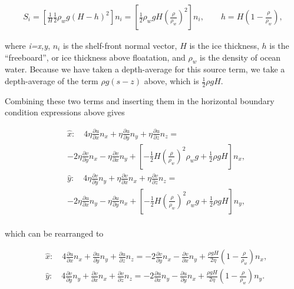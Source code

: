 \begin{align*}
S_{i}=\left[ \frac{1}{H}\frac{1}{2}\rho _{w}g\left( H-h \right)^{2} \right]n_{i}=\left[ \frac{1}{2}\rho _{w}gH\left( \frac{\rho }{\rho _{w}} \right)^{2} \right]n_{i},\quad \quad h=H\left( 1-\frac{\rho _{{}}}{\rho _{w}} \right),
\end{align*}

where  \textit{i=x,y}, $n_i$ is the shelf-front normal vector, $H$ is the ice thickness, $h$ is the ``freeboard'', or ice thickness above floatation, and $\rho_w$ is the density of ocean water. Because we have taken a depth-average for this source term, we take a depth-average of the term $\rho g\left( s-z \right)$ above, which is $\frac{1}{2}\rho gH$.

Combining these two terms and inserting them in the horizontal boundary condition expressions above gives

\begin{align*}
& \hat{x}:\quad 4\eta \frac{\partial u}{\partial x}n_{x}+\eta \frac{\partial u}{\partial y}n_{y}+\eta \frac{\partial u}{\partial z}n_{z}= \\
& -2\eta \frac{\partial v}{\partial y}n_{x}-\eta \frac{\partial v}{\partial x}n_{y}+\left[ -\frac{1}{2}H\left( \frac{\rho }{\rho _{w}} \right)^{2}\rho _{w}g+\frac{1}{2}\rho gH \right]n_{x}, \\ 
 & \hat{y}:\quad 4\eta \frac{\partial v}{\partial y}n_{y}+\eta \frac{\partial v}{\partial x}n_{x}+\eta \frac{\partial v}{\partial z}n_{z}= \\
 & -2\eta \frac{\partial u}{\partial x}n_{y}-\eta \frac{\partial u}{\partial y}n_{x}+\left[ -\frac{1}{2}H\left( \frac{\rho }{\rho _{w}} \right)^{2}\rho _{w}g+\frac{1}{2}\rho gH \right]n_{y}, \\ 
\end{align*}

which can be rearranged to

\begin{align*}
  & \hat{x}:\quad 4\frac{\partial u}{\partial x}n_{x}+\frac{\partial u}{\partial y}n_{y}+\frac{\partial u}{\partial z}n_{z}=-2\frac{\partial v}{\partial y}n_{x}-\frac{\partial v}{\partial x}n_{y}+\frac{\rho gH}{2\eta }\left( 1-\frac{\rho }{\rho _{w}} \right)n_{x}, \\ 
 & \hat{y}:\quad 4\frac{\partial v}{\partial y}n_{y}+\frac{\partial v}{\partial x}n_{x}+\frac{\partial v}{\partial z}n_{z}=-2\frac{\partial u}{\partial x}n_{y}-\frac{\partial u}{\partial y}n_{x}+\frac{\rho gH}{2\eta }\left( 1-\frac{\rho }{\rho _{w}} \right)n_{y}. \\ 
\end{align*}

